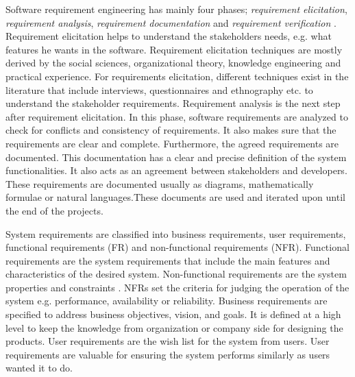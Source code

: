 	Software requirement engineering has mainly four phases; \emph{requirement
elicitation}, \emph{requirement analysis}, \emph{requirement documentation} and
\emph{requirement verification} \cite {Kotonya:1998}. Requirement elicitation
\cite{Coughlan:2002, Zowghi2005} helps to understand the
stakeholders needs, e.g. what features he wants in the software.
Requirement elicitation techniques are mostly derived by the social sciences,
organizational theory, knowledge engineering and practical experience. For
requirements elicitation, different techniques exist in the literature that
include interviews, questionnaires and ethnography etc. to understand the
stakeholder requirements.
Requirement analysis \cite{Nuseibeh:2000} is the next step
after requirement elicitation. In this phase, software requirements are analyzed
to check for conflicts and consistency of requirements. It also makes sure
that the requirements are clear and complete.
Furthermore, the agreed requirements are documented. This documentation has a clear and precise
definition of the system functionalities. It also acts as an agreement between
stakeholders and developers. These requirements are documented usually as diagrams, mathematically
formulae or natural languages.These documents are used and iterated upon until the end of the projects.

	System requirements are classified into business requirements, user
requirements, functional requirements (FR) and non-functional requirements (NFR). Functional
requirements are the system requirements that include the main features and
characteristics of the desired system. Non-functional requirements are the
system properties and constraints \cite{Davis:1993, Glinz}. NFRs set the
criteria for judging the operation of the system e.g.
performance, availability or reliability. Business requirements are specified to
address business objectives, vision, and goals. It is defined at a high level to
keep the knowledge from organization or company side for designing the products.
User requirements are the wish list for the system from users.
User requirements are valuable for ensuring the system performs similarly as users wanted it to do.
